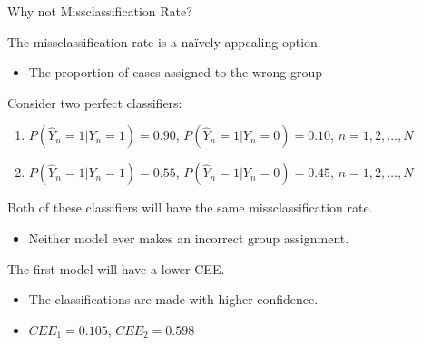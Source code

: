 \documentclass{beamer}\usepackage[]{graphicx}\usepackage[]{color}
\begin{document}

\begin{frame}{Why not Missclassification Rate?}
  


 The missclassification rate is a na\"{i}vely appealing option.
  \begin{itemize}
  \item The proportion of cases assigned to the wrong group
  \end{itemize}
  \vb
  Consider two perfect classifiers:
  \begin{enumerate}
  \item $P(\hat{Y}_n = 1 | Y_n = 1) = 0.90$,  $P(\hat{Y}_n = 1 | Y_n = 0) = 0.10$, $n = 1, 2, \ldots, N$
  \item $P(\hat{Y}_n = 1 | Y_n = 1) = 0.55$,  $P(\hat{Y}_n = 1 | Y_n = 0) = 0.45$, $n = 1, 2, \ldots, N$
  \end{enumerate}
  \vb
  Both of these classifiers will have the same missclassification rate.
  \begin{itemize}
  \item Neither model ever makes an incorrect group assignment.
  \end{itemize}
  \vb
  The first model will have a lower CEE.
  \begin{itemize}
  \item The classifications are made with higher confidence.
  \item $CEE_1 = 0.105$, $CEE_2 = 0.598$
  \end{itemize}
  
\end{frame}

\end{document}
